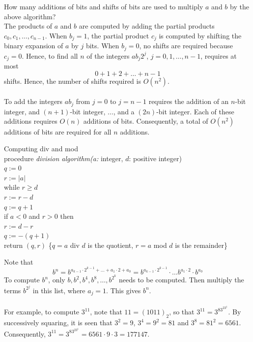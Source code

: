 \documentclass[12pt]{article}
\begin{document}
\begin{example} How many additions of bits and shifts of bits are used to multiply $a$ and $b$ by the above algorithm? \\ The products of $a$ and $b$ are computed by adding the partial products $c_0, c_1, \dots, c_{n - 1}$. When $b_j = 1$, the partial product $c_j$ is computed by shifting the binary expansion of $a$ by $j$ bits. When $b_j = 0$, no shifts are required because $c_j = 0$. Hence, to find all $n$ of the integers $ab_j2^j$, $j = 0, 1, \dots, n -1$, requires at most $$0 + 1 + 2 + \dots + n - 1$$ shifts. Hence, the number of shifts required is $O(n^2)$. \\~\\ To add the integers $ab_j$ from $j = 0$ to $j = n - 1$ requires the addition of an $n$-bit integer, and $(n + 1)$-bit integer, $\dots$, and a $(2n)$-bit integer. Each of these additions requires $O(n)$ additions of bits. Consequently, a total of $O(n^2)$ additions of bits are required for all $n$ additions. \end{example} 
\begin{alg} Computing div and mod \\ procedure \textit{division algorithm(a: }integer, $d$: positive integer) \\ $q := 0$ \\ $r := |a|$ \\ while $r \geq d$ \\ \indent $r := r - d$ \\ \indent $q := q + 1$ \\ if $a < 0$ and $r > 0$ then \\ \indent $r := d - r$ \\ \indent $q := -(q + 1)$ \\ return $(q, r)$ \{$q = a$ div $d$ is the quotient, $r = a$ mod $d$ is the remainder\} \end{alg} 
Note that $$b^n = b^{a_{k - 1} \cdot 2^{k - 1} + \dots + a_1\cdot 2 + a_0} = b^{a_{k - 1}\cdot 2^{k - 1}} \cdot \dots b^{a_1\cdot 2} \cdot b^{a_0}$$ To compute $b^n$, only $b, b^2, b^4, b^8, \dots, b^{2^k}$ needs to be computed. Then multiply the terms $b^{2^j}$ in this list, where $a_j = 1$. This gives $b^n$. \\~\\ For example, to compute $3^{11}$, note that $11 = (1011)_2$, so that $3^{11} = 3^83^23^1$. By successively squaring, it is seen that $3^2 = 9$, $3^4 = 9^2 = 81$ and $3^8 = 81^2 = 6561$. Consequently, $3^{11} = 3^83^23^1 = 6561 \cdot 9 \cdot 3 = 177147$. \\~\\
\end{document}
